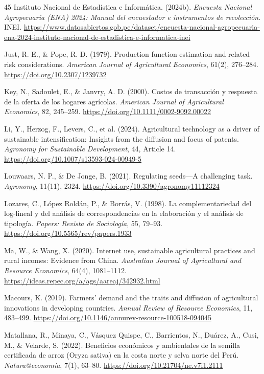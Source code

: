 \documentclass[11pt,a4paper,twocolumn]{article}
\begin{document}
\begin{thebibliography}{45}
Instituto Nacional de Estadística e Informática. (2024b). \textit{Encuesta Nacional Agropecuaria (ENA) 2024: Manual del encuestador e instrumentos de recolección}. INEI. \url{https://www.datosabiertos.gob.pe/dataset/encuesta-nacional-agropecuaria-ena-2024-instituto-nacional-de-estadistica-e-informatica-inei}

Just, R. E., \& Pope, R. D. (1979). Production function estimation and related risk considerations. \textit{American Journal of Agricultural Economics}, 61(2), 276--284. \url{https://doi.org/10.2307/1239732}

Key, N., Sadoulet, E., \& Janvry, A. D. (2000). Costos de transacción y respuesta de la oferta de los hogares agrícolas. \textit{American Journal of Agricultural Economics}, 82, 245--259. \url{https://doi.org/10.1111/0002-9092.00022}

Li, Y., Herzog, F., Levers, C., et al. (2024). Agricultural technology as a driver of sustainable intensification: Insights from the diffusion and focus of patents. \textit{Agronomy for Sustainable Development}, 44, Article 14. \url{https://doi.org/10.1007/s13593-024-00949-5}

Louwaars, N. P., \& De Jonge, B. (2021). Regulating seeds---A challenging task. \textit{Agronomy}, 11(11), 2324. \url{https://doi.org/10.3390/agronomy11112324}

Lozares, C., López Roldán, P., \& Borrás, V. (1998). La complementariedad del log-lineal y del análisis de correspondencias en la elaboración y el análisis de tipología. \textit{Papers: Revista de Sociología}, 55, 79--93. \url{https://doi.org/10.5565/rev/papers.1933}

Ma, W., \& Wang, X. (2020). Internet use, sustainable agricultural practices and rural incomes: Evidence from China. \textit{Australian Journal of Agricultural and Resource Economics}, 64(4), 1081--1112. \url{https://ideas.repec.org/a/ags/aareaj/342932.html}

Macours, K. (2019). Farmers' demand and the traits and diffusion of agricultural innovations in developing countries. \textit{Annual Review of Resource Economics}, 11, 483--499. \url{https://doi.org/10.1146/annurev-resource-100518-094045}

Matallana, R., Minaya, C., Vásquez Quispe, C., Barrientos, N., Duárez, A., Cusi, M., \& Velarde, S. (2022). Beneficios económicos y ambientales de la semilla certificada de arroz (Oryza sativa) en la costa norte y selva norte del Perú. \textit{Natura@economía}, 7(1), 63--80. \url{https://doi.org/10.21704/ne.v7i1.2111}


\end{thebibliography}
\end{document}
